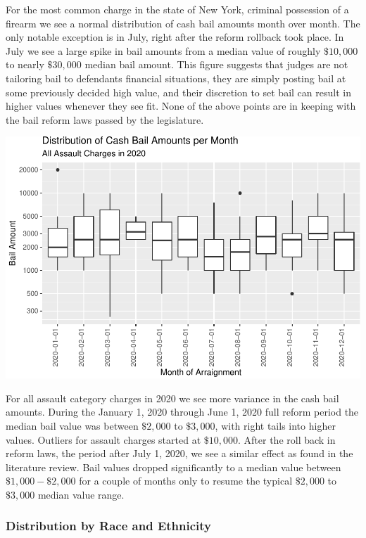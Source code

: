 \documentclass[
  english,
  man]{apa6}
\begin{document}
For the most common charge in the state of New York, criminal possession of a firearm we see a normal distribution of cash bail amounts month over month. The only notable exception is in July, right after the reform rollback took place. In July we see a large spike in bail amounts from a median value of roughly \(\$10,000\) to nearly \(\$30,000\) median bail amount. This figure suggests that judges are not tailoring bail to defendants financial situations, they are simply posting bail at some previously decided high value, and their discretion to set bail can result in higher values whenever they see fit. None of the above points are in keeping with the bail reform laws passed by the legislature.

\includegraphics{bail_reform_shamp_thesis_files/figure-latex/charge_distrb_120-1.pdf}

For all assault category charges in 2020 we see more variance in the cash bail amounts. During the January 1, 2020 through June 1, 2020 full reform period the median bail value was between \(\$2,000\) to \(\$3,000\), with right tails into higher values. Outliers for assault charges started at \(\$10,000\). After the roll back in reform laws, the period after July 1, 2020, we see a similar effect as found in the literature review. Bail values dropped significantly to a median value between \(\$1,000 - \$2,000\) for a couple of months only to resume the typical \(\$2,000\) to \(\$3,000\) median value range.

\hypertarget{distribution-by-race-and-ethnicity}{%
\subsubsection{Distribution by Race and Ethnicity}\label{distribution-by-race-and-ethnicity}}
\end{document}

